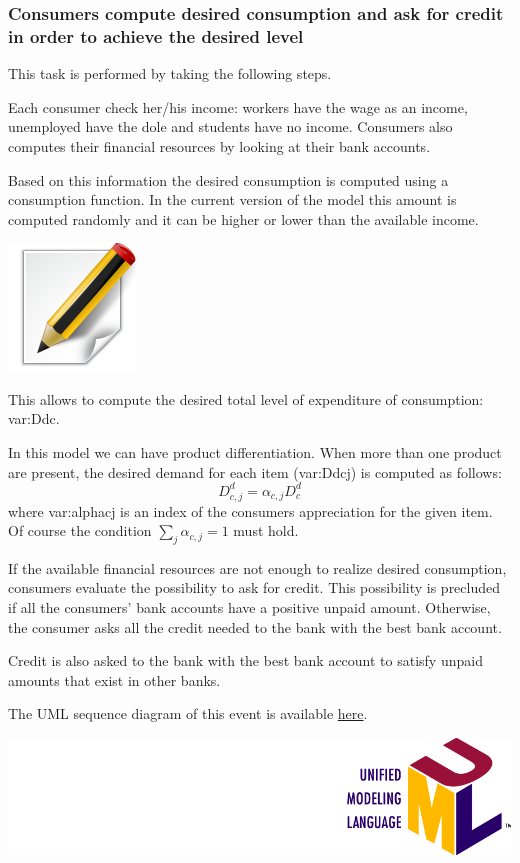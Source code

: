 \documentclass{book}
\newcommand{\doclocation}{file:///Users/giulioni/Documents/workspace/gabriele/docs}
\begin{document}
\subsubsection{Consumers compute desired consumption and ask for credit in order to achieve the desired level}
This task is performed by taking the following steps.

Each consumer check her/his income: workers have the wage as an income, unemployed have the dole and students have no income. Consumers also computes their financial resources by looking at their bank accounts. 

Based on this information the desired consumption is computed using a consumption function. In the current version of the model this amount is computed randomly and it can be higher or lower than the available income. 
\begin{marginfigure}
	\hskip2.5cm\includegraphics[scale=0.2]{edit.png}
\end{marginfigure}


This allows to compute the desired total level of expenditure of consumption: \gls{var:Ddc}.

In this model we can have product differentiation. When more than one product are present, the desired demand for each item (\gls{var:Ddcj}) is computed as follows:
\[
	D_{c,j}^d=\alpha_{c,j}D^d_{c}
\]
where \gls{var:alphacj} is an index of the consumers appreciation for the given item. Of course the condition $\sum_j \alpha_{c,j}=1$ must hold.

If the available financial resources are not enough to realize desired consumption, consumers evaluate the possibility to ask for credit. This possibility is precluded if all the consumers' bank accounts have a positive unpaid amount. Otherwise, the consumer asks all the credit needed to the bank with the best bank account. 

Credit is also asked to the bank with the best bank account to satisfy unpaid amounts that exist in other banks. 


The UML sequence diagram of this event is available \href{\doclocation/umldoc/stepDesiredConsumption.html}{here}.
\begin{marginfigure}
	\includegraphics[scale=0.1]{uml.png}
\end{marginfigure}
\end{document}
